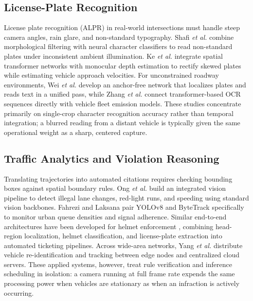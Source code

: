 \subsection{License-Plate Recognition}
License plate recognition (ALPR) in real-world intersections must handle steep camera angles, rain glare, and non-standard typography. Shafi \emph{et al.} \cite{shafi2022plate} combine morphological filtering with neural character classifiers to read non-standard plates under inconsistent ambient illumination. Ke \emph{et al.} \cite{ke2024trafficmonitoring} integrate spatial transformer networks with monocular depth estimation to rectify skewed plates while estimating vehicle approach velocities. For unconstrained roadway environments, Wei \emph{et al.} \cite{wei2024ealpr} develop an anchor-free network that localizes plates and reads text in a unified pass, while Zhang \emph{et al.} \cite{lpr2024emission} connect transformer-based OCR sequences directly with vehicle fleet emission models. These studies concentrate primarily on single-crop character recognition accuracy rather than temporal integration; a blurred reading from a distant vehicle is typically given the same operational weight as a sharp, centered capture.

\subsection{Traffic Analytics and Violation Reasoning}
Translating trajectories into automated citations requires checking bounding boxes against spatial boundary rules. Ong \emph{et al.} \cite{ong2024violation} build an integrated vision pipeline to detect illegal lane changes, red-light runs, and speeding using standard vision backbones. Fahrezi and Laksana \cite{fahrezi2024traffic} pair YOLOv8 and ByteTrack specifically to monitor urban queue densities and signal adherence. Similar end-to-end architectures have been developed for helmet enforcement \cite{helmet2024comprehensive}, combining head-region localization, helmet classification, and license-plate extraction into automated ticketing pipelines. Across wide-area networks, Yang \emph{et al.} \cite{yang2023ecoms} distribute vehicle re-identification and tracking between edge nodes and centralized cloud servers. These applied systems, however, treat rule verification and inference scheduling in isolation: a camera running at full frame rate expends the same processing power when vehicles are stationary as when an infraction is actively occurring.

